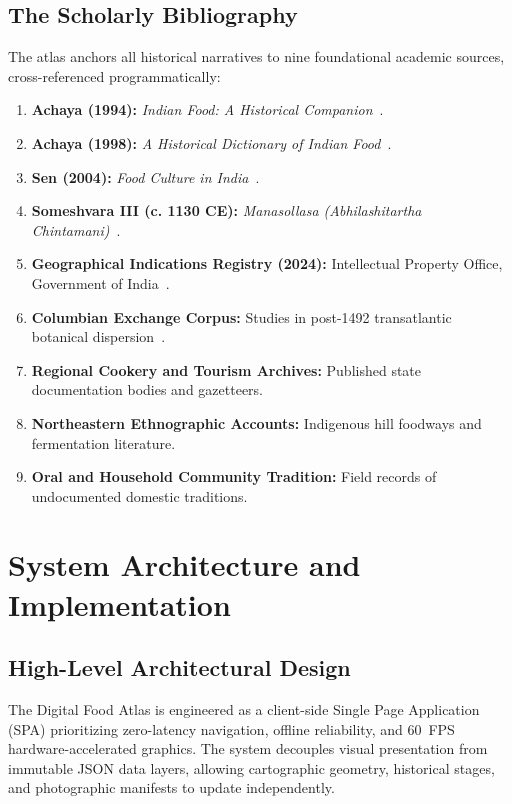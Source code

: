 \documentclass[11pt,a4paper]{report}
\begin{document}
\section{The Scholarly Bibliography}
The atlas anchors all historical narratives to nine foundational academic sources, cross-referenced programmatically:
\begin{enumerate}
    \item \textbf{Achaya (1994):} \emph{Indian Food: A Historical Companion}~\cite{achaya1994indian}.
    \item \textbf{Achaya (1998):} \emph{A Historical Dictionary of Indian Food}~\cite{achaya1998historical}.
    \item \textbf{Sen (2004):} \emph{Food Culture in India}~\cite{sen2004food}.
    \item \textbf{Someshvara III (c. 1130 CE):} \emph{Manasollasa (Abhilashitartha Chintamani)}~\cite{someshvara1130manasollasa}.
    \item \textbf{Geographical Indications Registry (2024):} Intellectual Property Office, Government of India~\cite{giregistry2024}.
    \item \textbf{Columbian Exchange Corpus:} Studies in post-1492 transatlantic botanical dispersion~\cite{crosby1972columbian}.
    \item \textbf{Regional Cookery and Tourism Archives:} Published state documentation bodies and gazetteers.
    \item \textbf{Northeastern Ethnographic Accounts:} Indigenous hill foodways and fermentation literature.
    \item \textbf{Oral and Household Community Tradition:} Field records of undocumented domestic traditions.
\end{enumerate}

\chapter{System Architecture and Implementation}

\section{High-Level Architectural Design}
The Digital Food Atlas is engineered as a client-side Single Page Application (SPA) prioritizing zero-latency navigation, offline reliability, and 60~FPS hardware-accelerated graphics. The system decouples visual presentation from immutable JSON data layers, allowing cartographic geometry, historical stages, and photographic manifests to update independently.
\end{document}
